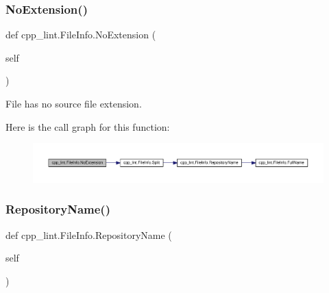 \subsubsection{\texorpdfstring{No\+Extension()}{NoExtension()}}
{\footnotesize\ttfamily def cpp\+\_\+lint.\+File\+Info.\+No\+Extension (\begin{DoxyParamCaption}\item[{}]{self }\end{DoxyParamCaption})}

\begin{DoxyVerb}File has no source file extension.\end{DoxyVerb}
 Here is the call graph for this function\+:
\nopagebreak
\begin{figure}[H]
\begin{center}
\leavevmode
\includegraphics[width=350pt]{classcpp__lint_1_1_file_info_a211532e8ea7f3ca3e02124bb3ff55426_cgraph}
\end{center}
\end{figure}
\mbox{\label{classcpp__lint_1_1_file_info_a62630bdb99c90fa78ea093c9a8512bb4}} 
\subsubsection{\texorpdfstring{Repository\+Name()}{RepositoryName()}}
{\footnotesize\ttfamily def cpp\+\_\+lint.\+File\+Info.\+Repository\+Name (\begin{DoxyParamCaption}\item[{}]{self }\end{DoxyParamCaption})}

